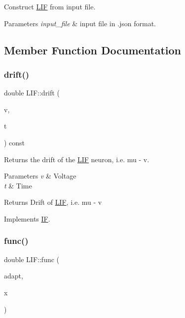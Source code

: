 Construct \hyperlink{classLIF}{L\+IF} from input file. 


\begin{DoxyParams}{Parameters}
{\em input\+\_\+file} & input file in .json format. \\
\hline
\end{DoxyParams}


\subsection{Member Function Documentation}
\mbox{\label{classLIF_a9b298ddf01f78240748137c3328fb1b7}} 
\subsubsection{\texorpdfstring{drift()}{drift()}}
{\footnotesize\ttfamily double L\+I\+F\+::drift (\begin{DoxyParamCaption}\item[{double}]{v,  }\item[{double}]{t }\end{DoxyParamCaption}) const\hspace{0.3cm}{\ttfamily [virtual]}}



Returns the drift of the \hyperlink{classLIF}{L\+IF} neuron, i.\+e. mu -\/ v. 


\begin{DoxyParams}{Parameters}
{\em v} & Voltage \\
\hline
{\em t} & Time \\
\hline
\end{DoxyParams}
\begin{DoxyReturn}{Returns}
Drift of \hyperlink{classLIF}{L\+IF}, i.\+e. mu -\/ v 
\end{DoxyReturn}


Implements \hyperlink{classIF_aa8a7a38f8fa3aa013df026734d02784c}{IF}.

\mbox{\label{classLIF_a70bf790c09810c219134fc22dcacbb18}} 
\subsubsection{\texorpdfstring{func()}{func()}}
{\footnotesize\ttfamily double L\+I\+F\+::func (\begin{DoxyParamCaption}\item[{\hyperlink{classExpAdaptation}{Exp\+Adaptation} \&}]{adapt,  }\item[{double}]{x }\end{DoxyParamCaption})}



